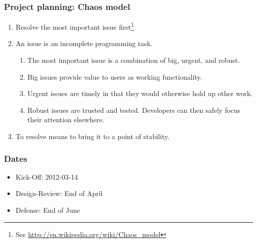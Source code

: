 \documentclass{beamer}
\begin{document}
\frame
{
  \frametitle{Project planning: Chaos model}
  \begin{enumerate}
     \item Resolve the most important issue first\footnote{See \url{http://en.wikipedia.org/wiki/Chaos_model}}
     \item An issue is an incomplete programming task.
      \begin{enumerate}
         \item The most important issue is a combination of big, urgent, and robust.
         \item Big issues provide value to users as working functionality.
         \item Urgent issues are timely in that they would otherwise hold up other work.
         \item Robust issues are trusted and tested. Developers can then safely focus their attention elsewhere.
      \end{enumerate}
     \item To resolve means to bring it to a point of stability.
  \end{enumerate}
}

\frame
{
  \frametitle{Dates}
  \begin{itemize}
     \item Kick-Off: 2012-03-14
     \item Design-Review: End of April
     \item Defense: End of June
  \end{itemize}
}
\end{document}
